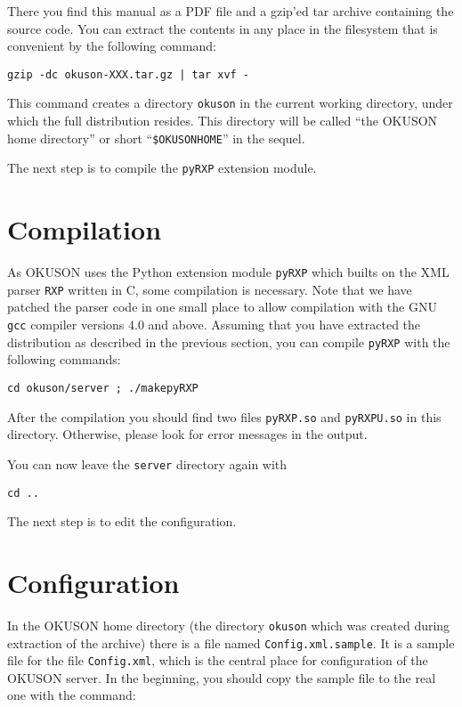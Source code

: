 \documentclass[12pt,openany,a4paper]{book}
\newcommand{\OKUSON}{\textsf{OKUSON}}
\begin{document}
\noindent There you find this manual as a PDF file and a gzip'ed tar archive
containing the source code. You can extract the contents in any place in
the filesystem that is convenient by the following command:

\hspace*{1cm}\texttt{gzip -dc okuson-XXX.tar.gz | tar xvf -}

This command creates a directory \texttt{okuson} in the current working
directory, under which the full distribution resides. This directory
will be called ``the {\OKUSON} home directory'' or short ``\verb!$OKUSONHOME!''
in the sequel.

The next step is to compile the \texttt{pyRXP} extension module.


\section{Compilation}

As {\OKUSON} uses the Python extension module \texttt{pyRXP} which builts 
on the XML parser \texttt{RXP} written in C, some compilation is necessary.
Note that we have patched the parser code in one small place to allow
compilation with the GNU \texttt{gcc} compiler versions 4.0 and above.
Assuming that you have extracted the distribution as described in the 
previous section, you can compile \texttt{pyRXP} with the following
commands:

\hspace*{1cm}\texttt{cd okuson/server ; ./makepyRXP}

\noindent After the compilation you should find two files \texttt{pyRXP.so} and 
\texttt{pyRXPU.so} in this directory. Otherwise, please look for error 
messages in the output.

\noindent You can now leave the \texttt{server} directory again with

\hspace*{1cm}\texttt{cd ..}

\noindent The next step is to edit the configuration.


\section{Configuration}

In the  {\OKUSON} home  directory (the  directory \texttt{okuson}  which was
created during  extraction of  the archive)  there is a  file named
\texttt{Config.xml.sample}. It is a sample file for the file 
\texttt{Config.xml}, which is the  central  place  for configuration  of  the
{\OKUSON} server. In the beginning, you should copy the sample file to
the real one with the command:
\end{document}

